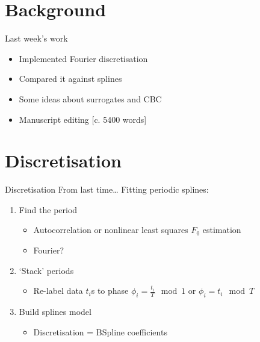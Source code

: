 \documentclass[presentation]{beamer}
\author{Mark Blyth}
\date{}
\title{}
\begin{document}
\section{Background}
\label{sec:org53eef45}
\begin{frame}[label={sec:orgbc26367}]{Last week's work}
\begin{itemize}
\item Implemented Fourier discretisation
\item Compared it against splines
\item Some ideas about surrogates and CBC
\item Manuscript editing \alert{[c. 5400 words]}
\end{itemize}
\end{frame}

\section{Discretisation}
\label{sec:org722f476}
\begin{frame}[label={sec:orgd1c1bc1}]{Discretisation}
From last time\ldots{}
\vfill
Fitting periodic splines:
\begin{enumerate}[<+->]
\item Find the period
\begin{itemize}
\item Autocorrelation or nonlinear least squares \(F_0\) estimation
\item Fourier?
\end{itemize}
\item `Stack' periods
\begin{itemize}
\item Re-label data \(t_i\)s to phase \(\phi_i = \frac{t_i}{T} \mod 1\) or \(\phi_i = t_i \mod T\)
\end{itemize}
\item Build splines model
\begin{itemize}
\item Discretisation = BSpline coefficients
\end{itemize}
\end{enumerate}
\end{frame}
\end{document}
